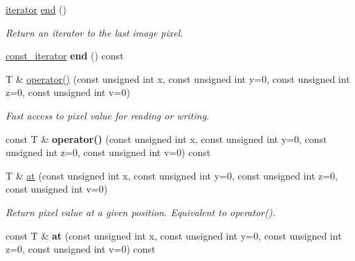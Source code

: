 \begin{DoxyCompactItemize}
\item 
\hypertarget{structcimg__library_1_1_c_img_a2583162076af8bfeed05f8f01d31ae05}{
\hyperlink{structcimg__library_1_1_c_img_a3ff3f07802e67c4ba930427ea45655c8}{iterator} \hyperlink{structcimg__library_1_1_c_img_a2583162076af8bfeed05f8f01d31ae05}{end} ()}
\label{structcimg__library_1_1_c_img_a2583162076af8bfeed05f8f01d31ae05}

\begin{DoxyCompactList}\small\item\em Return an iterator to the last image pixel. \item\end{DoxyCompactList}\item 
\hypertarget{structcimg__library_1_1_c_img_abf353a45f812becefe49ee27bc0a4f73}{
\hyperlink{structcimg__library_1_1_c_img_ad444f21017aaa7da6fab45930d3579aa}{const\_\-iterator} {\bfseries end} () const }
\label{structcimg__library_1_1_c_img_abf353a45f812becefe49ee27bc0a4f73}

\item 
T \& \hyperlink{structcimg__library_1_1_c_img_ac26d10a2b16190e0f4949a009250d041}{operator()} (const unsigned int x, const unsigned int y=0, const unsigned int z=0, const unsigned int v=0)
\begin{DoxyCompactList}\small\item\em Fast access to pixel value for reading or writing. \item\end{DoxyCompactList}\item 
\hypertarget{structcimg__library_1_1_c_img_a9b4449bca2023d43f3b4b9e973072680}{
const T \& {\bfseries operator()} (const unsigned int x, const unsigned int y=0, const unsigned int z=0, const unsigned int v=0) const }
\label{structcimg__library_1_1_c_img_a9b4449bca2023d43f3b4b9e973072680}

\item 
\hypertarget{structcimg__library_1_1_c_img_a6548e89af57209fe85dd65a8af7ad43b}{
T \& \hyperlink{structcimg__library_1_1_c_img_a6548e89af57209fe85dd65a8af7ad43b}{at} (const unsigned int x, const unsigned int y=0, const unsigned int z=0, const unsigned int v=0)}
\label{structcimg__library_1_1_c_img_a6548e89af57209fe85dd65a8af7ad43b}

\begin{DoxyCompactList}\small\item\em Return pixel value at a given position. Equivalent to operator(). \item\end{DoxyCompactList}\item 
\hypertarget{structcimg__library_1_1_c_img_a3b4ec7bd0b96430eabefa9d4289d7dad}{
const T \& {\bfseries at} (const unsigned int x, const unsigned int y=0, const unsigned int z=0, const unsigned int v=0) const }
\label{structcimg__library_1_1_c_img_a3b4ec7bd0b96430eabefa9d4289d7dad}


\end{DoxyCompactItemize}
